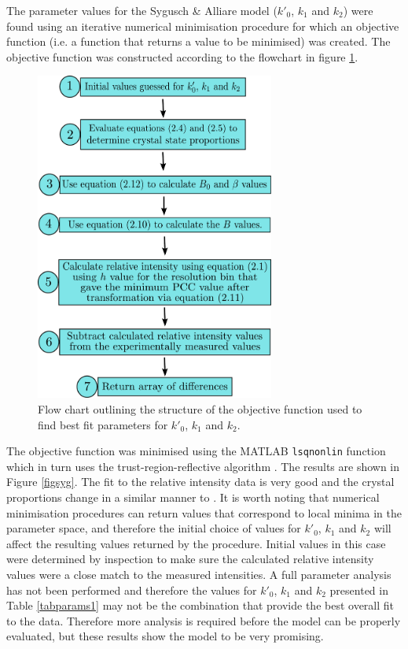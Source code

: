 The parameter values for the Sygusch \& Alliare model ($k'_0$, $k_1$ and $k_2$) were found using an iterative numerical minimisation procedure for which an objective function (i.e. a function that returns a value to be minimised) was created. The objective function was constructed according to the flowchart in figure \ref{figobjfun}.
\begin{figure}
  \centering
    \includegraphics[width=0.7\textwidth]{figures/dwd/objective_function_syg.pdf}
    \caption{Flow chart outlining the structure of the objective function used to find best fit parameters for $k'_0$, $k_1$ and $k_2$.}
    \label{figobjfun}
\end{figure}
The objective function was minimised using the MATLAB \verb+lsqnonlin+ function which in turn uses the trust-region-reflective algorithm \cite{coleman1996}.  The results are shown in Figure \ref{figsyg}. The fit to the relative intensity data is very good and the crystal proportions change in a similar manner to \cite{owen2014}. It is worth noting that numerical minimisation procedures can return values that correspond to local minima in the parameter space, and therefore the initial choice of values for $k'_0$, $k_1$ and $k_2$ will affect the resulting values returned by the procedure. Initial values in this case were determined by inspection to make sure the calculated relative intensity values were a close match to the measured intensities. A full parameter analysis has not been performed and therefore the values for $k'_0$, $k_1$ and $k_2$ presented in Table \ref{tabparams1} may not be the combination that provide the best overall fit to the data. Therefore more analysis is required before the model can be properly evaluated, but these results show the model to be very promising.
